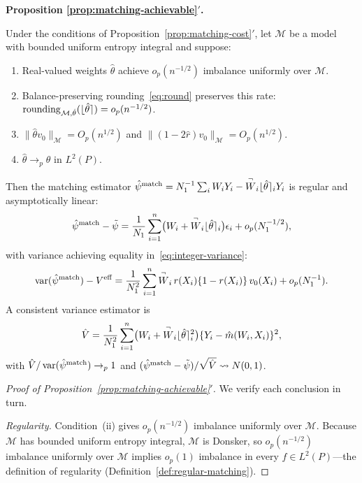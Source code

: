 \documentclass{article}
\newcommand{\paragraph}[1]{\par\noindent\textit{#1}\enspace}
\newenvironment{propositionprime}[1]{%
  \par\medskip\noindent\textbf{Proposition #1$'$.}\itshape\space
}{%
  \par\medskip
}
\theoremstyle{definition}
\DeclareMathOperator{\Var}{var}
\DeclarePairedDelimiter\round{\lfloor}{\rceil}
\DeclareMathOperator{\roundingerror}{rounding}
\newcommand{\model}{\mathcal{M}}
\newcommand{\<}{\langle}
\renewcommand{\>}{\rangle}
\begin{document}
\begin{refsection}
\begin{propositionprime}{\ref{prop:matching-achievable}}
Under the conditions of Proposition~\ref{prop:matching-cost}$'$, let $\model$ be a model with bounded uniform entropy integral and suppose:
\begin{enumerate}
\item[(i)] Real-valued weights $\hat\theta$ achieve $o_p(n^{-1/2})$ imbalance uniformly over $\model$.
\item[(ii)] Balance-preserving rounding~\eqref{eq:round} preserves this rate: $\roundingerror_{\model,\hat\theta}(\round{\hat\theta}) = o_p(n^{-1/2})$.
\item[(iii)] $\|\hat\theta v_0\|_\model = O_p(n^{1/2})$ and $\|(1{-}2\hat r)v_0\|_\model = O_p(n^{1/2})$.
\item[(iv)] $\hat\theta \to_p \theta$ in $L^2(P)$.
\end{enumerate}
Then the matching estimator $\hat\psi^{\textup{match}} = N_1^{-1}\sum_i W_i Y_i - \overset{\neg}{W}_i \round{\hat\theta}_i Y_i$ is regular and asymptotically linear:
\[
\hat\psi^{\textup{match}} - \tilde\psi = \frac{1}{N_1}\sum_{i=1}^n\bigl(W_i + \overset{\neg}{W}_i\round{\hat\theta}_i\bigr)\epsilon_i + o_p(N_1^{-1/2}),
\]
with variance achieving equality in~\eqref{eq:integer-variance}:
\[
\Var(\hat\psi^{\textup{match}}) - V^{\textup{eff}} = \frac{1}{N_1^2}\sum_{i=1}^n \overset{\neg}{W}_i\, r(X_i)\{1-r(X_i)\}\,v_0(X_i) + o_p(N_1^{-1}).
\]
A consistent variance estimator is
\begin{equation}
\label{eq:integer-variance-estimator}
\hat V = \frac{1}{N_1^2}\sum_{i=1}^n \bigl(W_i + \overset{\neg}{W}_i\round{\hat\theta}_i^2\bigr)\{Y_i - \hat m(W_i,X_i)\}^2,
\end{equation}
with $\hat V / \Var(\hat\psi^{\textup{match}}) \to_p 1$ and $(\hat\psi^{\textup{match}} - \tilde\psi)/\sqrt{\hat V} \rightsquigarrow N(0,1)$.
\end{propositionprime}

\begin{proof}[Proof of Proposition~\ref{prop:matching-achievable}$'$]
We verify each conclusion in turn.

\paragraph{Regularity.}
Condition~(ii) gives $o_p(n^{-1/2})$ imbalance uniformly over $\model$. Because $\model$ has bounded uniform entropy integral, $\model$ is Donsker, so $o_p(n^{-1/2})$ imbalance uniformly over $\model$ implies $o_p(1)$ imbalance in every $f \in L^2(P)$---the definition of regularity (Definition~\ref{def:regular-matching}).


\end{proof}
\end{refsection}
\end{document}
